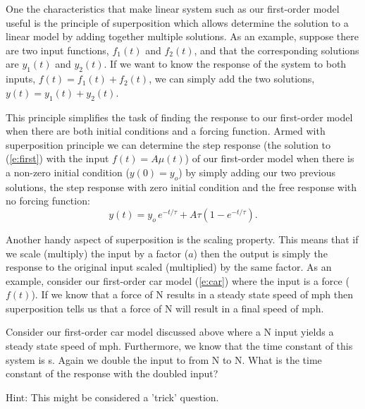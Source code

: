 One the characteristics that make linear system such as our first-order model useful is the principle of \gls{superposition} which allows determine the solution to a linear model by adding together multiple solutions.  As an example, suppose there are two input functions, $f_1(t)$ and $f_2(t)$, and that the corresponding solutions are $y_1(t)$ and $y_2(t)$.  If we want to know the response of the system to both inputs, $f(t)=f_1(t)+f_2(t)$, we can simply add the two solutions, $y(t)=y_1(t)+y_2(t)$. 

This principle simplifies the task of finding the response to our first-order model when there are both initial conditions and a forcing function.  Armed with superposition principle we can determine the step response (the solution to (\ref{e:first}) with the input $f(t)=A\mu(t)$) of our first-order model when there is a non-zero initial condition ($y(0)=y_o$) by simply adding our two previous solutions, the step response with zero initial condition and the free response with no forcing function:
\begin{equation}
y(t) = y_o \, e^{-t/\tau} + A\tau\left(1-e^{-t/\tau}\right).
\end{equation}

Another handy aspect of superposition is the scaling property.  This means that if we scale (multiply) the input by a factor ($a$) then the output is simply the response to the original input scaled (multiplied) by the same factor.  As an example, consider our first-order car model (\ref{e:car}) where the input is a force ($f(t)$).  If we know that a force of \unit[1,000]{N} results in a steady state speed of \unit[25]{mph} then superposition tells us that a force of \unit[2,000]{N} will result in a final speed of \unit[50]{mph}.

\begin{ex}
Consider our first-order car model discussed above where a \unit[1,000]{N} input yields a steady state speed of \unit[25]{mph}.  Furthermore, we know that the time constant of this system is \unit[2]{s}.  Again we double the input to from \unit[1,000]{N} to  \unit[2,000]{N}. What is the time constant of the response with the doubled input?

Hint: This might be considered a 'trick' question.
\end{ex}
